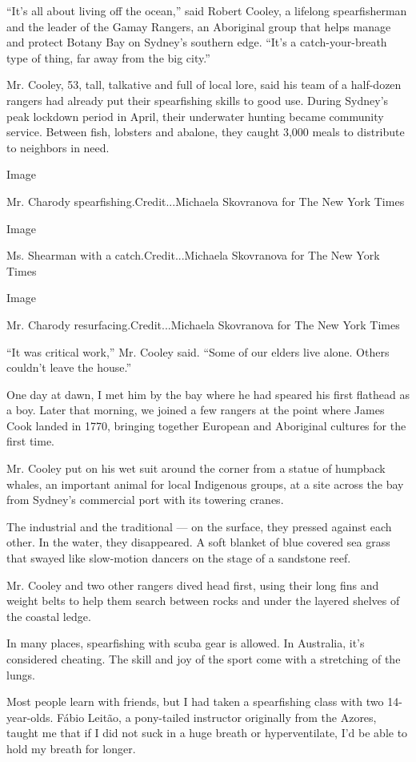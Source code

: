``It's all about living off the ocean,'' said Robert Cooley, a lifelong
spearfisherman and the leader of the Gamay Rangers, an Aboriginal group
that helps manage and protect Botany Bay on Sydney's southern edge.
``It's a catch-your-breath type of thing, far away from the big city.''

Mr. Cooley, 53, tall, talkative and full of local lore, said his team of
a half-dozen rangers had already put their spearfishing skills to good
use. During Sydney's peak lockdown period in April, their underwater
hunting became community service. Between fish, lobsters and abalone,
they caught 3,000 meals to distribute to neighbors in need.

Image

Mr. Charody spearfishing.Credit...Michaela Skovranova for The New York
Times

Image

Ms. Shearman with a catch.Credit...Michaela Skovranova for The New York
Times

Image

Mr. Charody resurfacing.Credit...Michaela Skovranova for The New York
Times

``It was critical work,'' Mr. Cooley said. ``Some of our elders live
alone. Others couldn't leave the house.''

One day at dawn, I met him by the bay where he had speared his first
flathead as a boy. Later that morning, we joined a few rangers at the
point where James Cook landed in 1770, bringing together European and
Aboriginal cultures for the first time.

Mr. Cooley put on his wet suit around the corner from a statue of
humpback whales, an important animal for local Indigenous groups, at a
site across the bay from Sydney's commercial port with its towering
cranes.

The industrial and the traditional --- on the surface, they pressed
against each other. In the water, they disappeared. A soft blanket of
blue covered sea grass that swayed like slow-motion dancers on the stage
of a sandstone reef.

Mr. Cooley and two other rangers dived head first, using their long fins
and weight belts to help them search between rocks and under the layered
shelves of the coastal ledge.

In many places, spearfishing with scuba gear is allowed. In Australia,
it's considered cheating. The skill and joy of the sport come with a
stretching of the lungs.

Most people learn with friends, but I had taken a spearfishing class
with two 14-year-olds. Fábio Leitão, a pony-tailed instructor originally
from the Azores, taught me that if I did not suck in a huge breath or
hyperventilate, I'd be able to hold my breath for longer.

